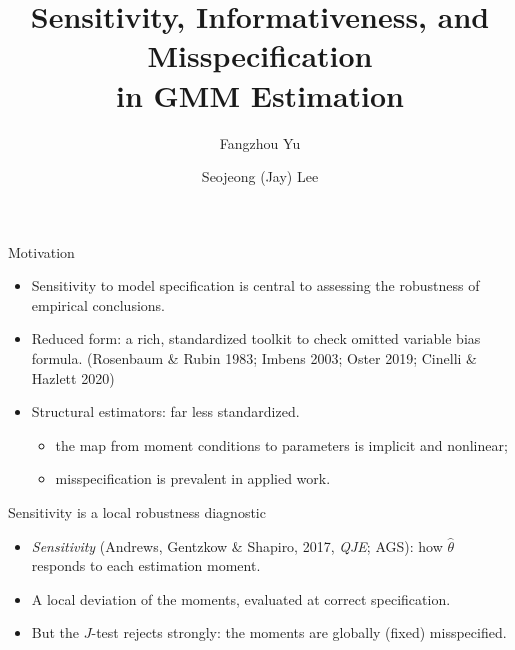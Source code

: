 \documentclass[11pt,aspectratio=169]{beamer}
\title{Sensitivity, Informativeness, and Misspecification\\in GMM Estimation}
\author{Fangzhou Yu\inst{1} \and Seojeong (Jay) Lee\inst{2}}
\institute{\inst{1}University of Sydney \and \inst{2}Seoul National University}
\date{}
\begin{document}
\begin{frame}
    \titlepage
\end{frame}

\begin{frame}{Motivation}
    \begin{itemize}\setlength{\itemsep}{1.0em}
        \item Sensitivity to model specification is central to assessing the
              \alert{robustness} of empirical conclusions.
        \item Reduced form: a rich, standardized toolkit to check
              omitted variable bias formula. 
              (Rosenbaum \& Rubin 1983;
              Imbens 2003; Oster 2019; Cinelli \& Hazlett 2020)
        \item Structural estimators: \alert{far less standardized}.
              \begin{itemize}\small\setlength{\itemsep}{0.3em}
                  \item the map from moment conditions to parameters is
                        implicit and nonlinear;
                  \item misspecification is prevalent in applied work.
              \end{itemize}
    \end{itemize}
\end{frame}

\begin{frame}{Sensitivity is a local robustness diagnostic}
    \begin{itemize}\setlength{\itemsep}{1.0em}
        \item \emph{Sensitivity} (Andrews, Gentzkow \& Shapiro, 2017,
              \textit{QJE}; AGS): how $\widehat\theta$ responds to each
              estimation moment.
        \item A \alert{local} deviation of the moments, evaluated at
              \alert{correct specification}.
        \item But the $J$-test rejects strongly: the moments are
              \alert{globally (fixed) misspecified}.
    \end{itemize}
\end{frame}
\end{document}
